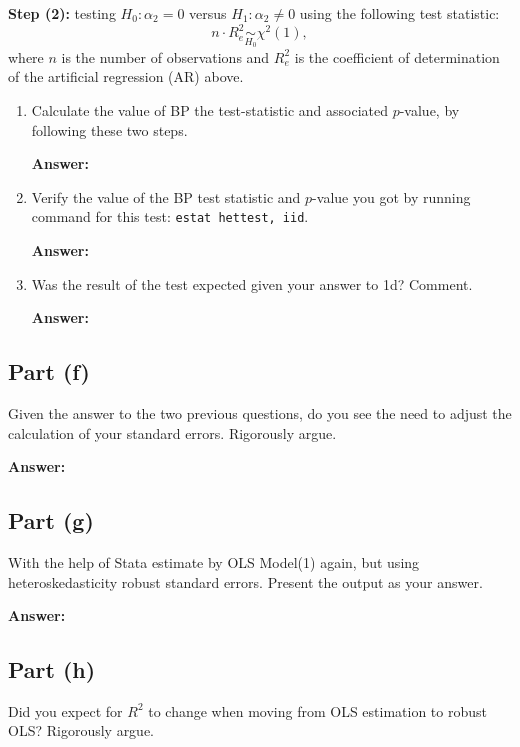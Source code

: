 \documentclass[12pt,a4paper]{article}
\begin{document}
\textbf{Step (2):} testing $H_0: \alpha_2 = 0$ versus $H_1: \alpha_2 \neq 0$ using the following test statistic:
\[
n \cdot R_e^2 \underset{H_0}{\sim} \chi^2(1),
\]
where $n$ is the number of observations and $R_e^2$ is the coefficient of determination of the artificial regression (AR) above.

\begin{enumerate}[label=(\roman*)]
  \item Calculate the value of BP the test-statistic and associated $p$-value, by following these two steps.
  
  \textbf{Answer:}
  
  
  
  \item Verify the value of the BP test statistic and $p$-value you got by running command for this test: \texttt{estat hettest, iid}.
  
  \textbf{Answer:}
  
  
  
  \item Was the result of the test expected given your answer to 1d? Comment.
  
  \textbf{Answer:}
  
  
\end{enumerate}

\subsection*{Part (f)}
Given the answer to the two previous questions, do you see the need to adjust the calculation of your standard errors. Rigorously argue.

\textbf{Answer:}



\subsection*{Part (g)}
With the help of Stata estimate by OLS Model(1) again, but using heteroskedasticity robust standard errors. Present the output as your answer.

\textbf{Answer:}



\subsection*{Part (h)}
Did you expect for $R^2$ to change when moving from OLS estimation to robust OLS? Rigorously argue.
\end{document}
